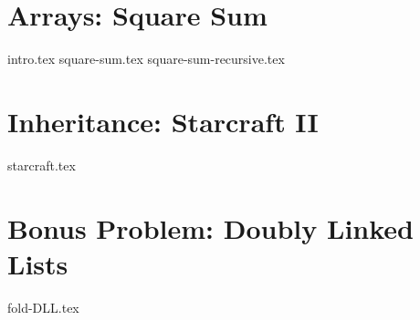 \documentclass[11pt]{exam}
\begin{document}
\clearpage



\section{Arrays: Square Sum}

\begin{questions}
{intro.tex} 
{square-sum.tex} 
{square-sum-recursive.tex} 
\end{questions}

\clearpage


\section{Inheritance: Starcraft II}

\begin{questions}
{starcraft.tex}
\end{questions}

\clearpage


\section{Bonus Problem: Doubly Linked Lists}

\begin{questions}
{fold-DLL.tex} 
\end{questions}
\end{document}
